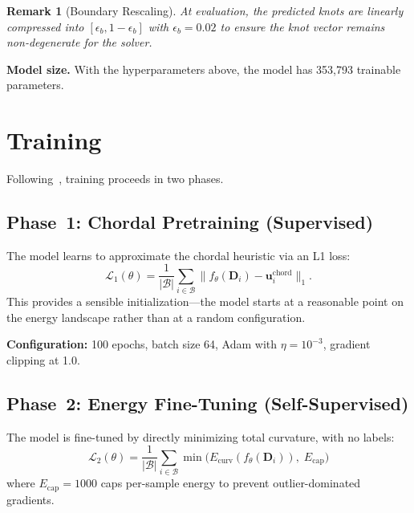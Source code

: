 \documentclass[11pt, a4paper]{article}
\newtheorem{remark}{Remark}
\newcommand{\bD}{\mathbf{D}}
\newcommand{\bu}{\mathbf{u}}
\newcommand{\norm}[1]{\lVert #1 \rVert}
\begin{document}
\begin{remark}[Boundary Rescaling]
At evaluation, the predicted knots are linearly compressed into
$[\epsilon_b, 1 - \epsilon_b]$ with $\epsilon_b = 0.02$ to ensure the
knot vector remains non-degenerate for the solver.
\end{remark}

\textbf{Model size.} With the hyperparameters above, the model has
353{,}793 trainable parameters.


\section{Training}
\label{sec:training}

Following~\cite{Chhetri2024}, training proceeds in two phases.

\subsection{Phase~1: Chordal Pretraining (Supervised)}

The model learns to approximate the chordal heuristic via an L1 loss:
\begin{equation}
  \mathcal{L}_1(\theta) =
    \frac{1}{|\mathcal{B}|}\sum_{i \in \mathcal{B}}
    \norm{f_\theta(\bD_i) - \bu_i^{\text{chord}}}_1.
  \label{eq:phase1_loss}
\end{equation}
This provides a sensible initialization---the model starts at a reasonable
point on the energy landscape rather than at a random configuration.

\textbf{Configuration:} 100 epochs, batch size 64, Adam with
$\eta = 10^{-3}$, gradient clipping at 1.0.


\subsection{Phase~2: Energy Fine-Tuning (Self-Supervised)}

The model is fine-tuned by directly minimizing total curvature, with
no labels:
\begin{equation}
  \boxed{\;\mathcal{L}_2(\theta) =
    \frac{1}{|\mathcal{B}|}\sum_{i \in \mathcal{B}}
    \min\bigl(E_{\text{curv}}(f_\theta(\bD_i)),\; E_{\text{cap}}\bigr)\;}
  \label{eq:phase2_loss}
\end{equation}
where $E_{\text{cap}} = 1000$ caps per-sample energy to prevent
outlier-dominated gradients.
\end{document}
